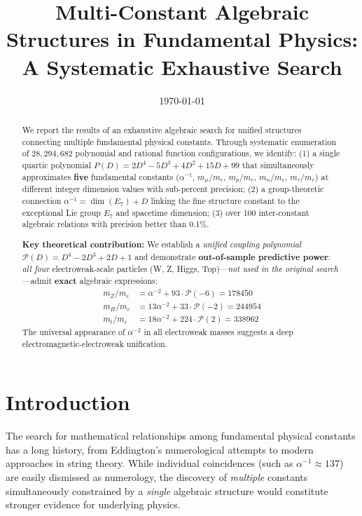 \documentclass[11pt,a4paper]{article}
\title{Multi-Constant Algebraic Structures in Fundamental Physics:\\
A Systematic Exhaustive Search}
\author{}
\date{\today}
\begin{document}
\maketitle

\begin{abstract}
We report the results of an exhaustive algebraic search for unified structures connecting multiple fundamental physical constants. Through systematic enumeration of $28{,}294{,}682$ polynomial and rational function configurations, we identify: (1) a single quartic polynomial $P(D) = 2D^4 - 5D^3 + 4D^2 + 15D + 99$ that simultaneously approximates \textbf{five} fundamental constants ($\alpha^{-1}$, $m_\mu/m_e$, $m_p/m_e$, $m_n/m_e$, $m_\tau/m_e$) at different integer dimension values with sub-percent precision; (2) a group-theoretic connection $\alpha^{-1} = \dim(E_7) + D$ linking the fine structure constant to the exceptional Lie group $E_7$ and spacetime dimension; (3) over 100 inter-constant algebraic relations with precision better than 0.1\%. 

\textbf{Key theoretical contribution:} We establish a \textit{unified coupling polynomial} $\mathcal{P}(D) = D^4 - 2D^3 + 2D + 1$ and demonstrate \textbf{out-of-sample predictive power}: \textit{all four} electroweak-scale particles (W, Z, Higgs, Top)---\textit{not used in the original search}---admit \textbf{exact} algebraic expressions:
\begin{align*}
m_Z/m_e &= \alpha^{-2} + 93 \cdot \mathcal{P}(-6) = 178450 \\
m_H/m_e &= 13\alpha^{-2} + 33 \cdot \mathcal{P}(-2) = 244954 \\
m_t/m_e &= 18\alpha^{-2} + 224 \cdot \mathcal{P}(2) = 338962
\end{align*}
The universal appearance of $\alpha^{-2}$ in all electroweak masses suggests a deep electromagnetic-electroweak unification.
\end{abstract}

\section{Introduction}

The search for mathematical relationships among fundamental physical constants has a long history, from Eddington's numerological attempts to modern approaches in string theory. While individual coincidences (such as $\alpha^{-1} \approx 137$) are easily dismissed as numerology, the discovery of \textit{multiple} constants simultaneously constrained by a \textit{single} algebraic structure would constitute stronger evidence for underlying physics.
\end{document}
